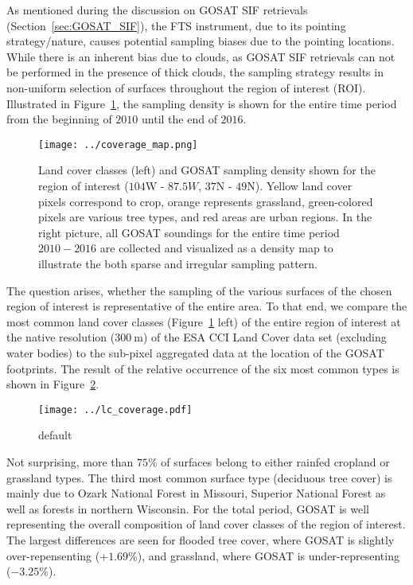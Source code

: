 \documentclass[preprint, a4paper, 10pt, times]{elsarticle}
\begin{document}
As mentioned during the discussion on GOSAT SIF retrievals (Section~\ref{sec:GOSAT_SIF}), the FTS instrument, due to its pointing strategy/nature, causes potential sampling biases due to the pointing locations. While there is an inherent bias due to clouds, as GOSAT SIF retrievals can not be performed in the presence of thick clouds, the sampling strategy results in non-uniform selection of surfaces throughout the region of interest (ROI). Illustrated in Figure~\ref{fig:sampling}, the sampling density is shown for the entire time period from the beginning of $2010$ until the end of $2016$. 

\begin{figure}[htbp]
\centering
\texttt{[image: ../coverage\_map.png]}
\caption{Land cover classes (left) and GOSAT sampling density shown for the region of interest ($104$W - $87.5W$, $37$N - $49$N). Yellow land cover pixels correspond to crop, orange represents grassland, green-colored pixels are various tree types, and red areas are urban regions. In the right picture, all GOSAT soundings for the entire time period $2010-2016$ are collected and visualized as a density map to illustrate the both sparse and irregular sampling pattern.}
\label{fig:sampling}
\end{figure}

The question arises, whether the sampling of the various surfaces of the chosen region of interest is representative of the entire area. To that end, we compare the most common land cover classes (Figure~\ref{fig:sampling} left) of the entire region of interest at the native resolution ($300\:\mathrm{m}$) of the ESA CCI Land Cover data set (excluding water bodies) to the sub-pixel aggregated data at the location of the GOSAT footprints. The result of the relative occurrence of the six most common types is shown in Figure~\ref{fig:lc_coverage}. 

\begin{figure}[htbp]
\centering
\texttt{[image: ../lc\_coverage.pdf]}
\caption{default}
\label{fig:lc_coverage}
\end{figure}

Not surprising, more than $75\%$ of surfaces belong to either rainfed cropland or grassland types. The third most common surface type (deciduous tree cover) is mainly due to Ozark National Forest in Missouri, Superior National Forest as well as forests in northern Wisconsin. For the total period, GOSAT is well representing the overall composition of land cover classes of the region of interest. The largest differences are seen for flooded tree cover, where GOSAT is slightly over-repensenting ($+1.69\%$), and grassland, where GOSAT is under-representing ($-3.25\%$).
\end{document}
